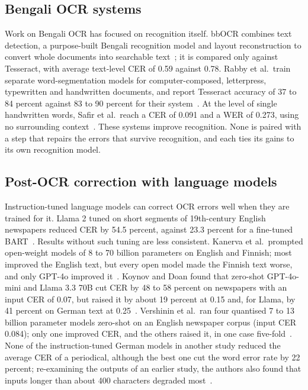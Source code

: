 \documentclass[conference]{IEEEtran}
\begin{document}
\subsection{Bengali OCR systems}
Work on Bengali OCR has focused on recognition itself. bbOCR combines text detection, a purpose-built Bengali recognition model and layout reconstruction to convert whole documents into searchable text~\cite{zulkarnain2023bbocr}; it is compared only against Tesseract, with average text-level CER of 0.59 against 0.78. Rabby et al.\ train separate word-segmentation models for computer-composed, letterpress, typewritten and handwritten documents, and report Tesseract accuracy of 37 to 84 percent against 83 to 90 percent for their system~\cite{rabby2024enhancement}. At the level of single handwritten words, Safir et al.\ reach a CER of 0.091 and a WER of 0.273, using no surrounding context~\cite{safir2021endtoend}. These systems improve recognition. None is paired with a step that repairs the errors that survive recognition, and each ties its gains to its own recognition model.

\subsection{Post-OCR correction with language models}
Instruction-tuned language models can correct OCR errors well when they are trained for it. Llama 2 tuned on short segments of 19th-century English newspapers reduced CER by 54.5 percent, against 23.3 percent for a fine-tuned BART~\cite{thomas2024leveraging}. Results without such tuning are less consistent. Kanerva et al.\ prompted open-weight models of 8 to 70 billion parameters on English and Finnish; most improved the English text, but every open model made the Finnish text worse, and only GPT-4o improved it~\cite{kanerva2025nofreelunches}. Koynov and Doan found that zero-shot GPT-4o-mini and Llama 3.3 70B cut CER by 48 to 58 percent on newspapers with an input CER of 0.07, but raised it by about 19 percent at 0.15 and, for Llama, by 41 percent on German text at 0.25~\cite{koynov2025opportunities}. Vershinin et al.\ ran four quantised 7 to 13 billion parameter models zero-shot on an English newspaper corpus (input CER 0.084); only one improved CER, and the others raised it, in one case five-fold~\cite{vershinin2025lightweight}. None of the instruction-tuned German models in another study reduced the average CER of a periodical, although the best one cut the word error rate by 22 percent; re-examining the outputs of an earlier study, the authors also found that inputs longer than about 400 characters degraded most~\cite{danilova2025german}.
\end{document}
